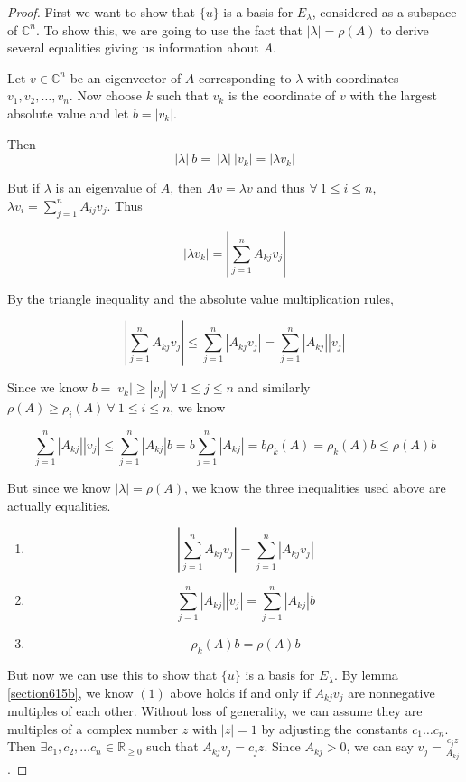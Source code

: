 \documentclass{amsart}
\theoremstyle{definition}
\theoremstyle{remark}
\numberwithin{equation}{section}
\begin{document}
\begin{proof}

First we want to show that $\{ u \}$ is a basis for $E_{\lambda}$,
considered as a subspace of $\mathbb{C}^n$. To show this, we are
going to use the fact that $|\lambda| = \rho(A)$ to derive several
equalities giving us information about $A$.

Let $v \in \mathbb{C}^n$ be an eigenvector of $A$ corresponding to
$\lambda$ with coordinates $v_1, v_2, \ldots, v_n$. Now choose $k$
such that $v_k$ is the coordinate of $v$ with the largest absolute
value and let $b = |v_k|$.

Then $$ |\lambda|\ b =\ |\lambda|\ |v_k| = |\lambda v_k| $$

But if $\lambda$ is an eigenvalue of $A$, then $Av = \lambda v$ and thus $\forall\ 1 \leq i \leq n$, $\lambda v_i = \sum_{j = 1}^n A_{ij}v_j$.
Thus

$$ |\lambda v_k| = | \sum_{j = 1}^n A_{kj}v_j | $$

By the triangle inequality and the absolute value multiplication
rules,

$$ | \sum_{j = 1}^n A_{kj}v_j | \leq \sum_{j=1}^n |A_{kj}v_j| = \sum_{j=1}^n |A_{kj}| |v_j| $$

Since we know $b = |v_k| \geq |v_j| \ \forall\ 1 \leq j \leq n$ and
similarly $\rho(A) \geq  \rho_i(A)\ \forall\ 1 \leq i \leq n $, we
know

$$ \sum_{j=1}^n |A_{kj}| |v_j|  \leq \sum_{j=1}^n |A_{kj}| b = b \sum_{j=1}^n |A_{kj}| =  b\rho_k(A) = \rho_k(A)b \leq \rho(A)b $$


But since we know $|\lambda| = \rho(A)$, we know the three inequalities used above are actually equalities.

\begin{enumerate}

    \item $$| \sum_{j = 1}^n A_{kj}v_j | = \sum_{j=1}^n |A_{kj}v_j|$$

    \item $$\sum_{j=1}^n |A_{kj}| |v_j|  = \sum_{j=1}^n |A_{kj}| b$$

    \item $$\rho_k(A)b = \rho(A)b$$ \newline

\end{enumerate}


But now we can use this to show that $\{ u \}$ is a basis for
$E_{\lambda}$. By lemma \ref{section615b}, we know $(1)$ above holds
if and only if $A_{kj}v_j$ are nonnegative multiples of each other.
Without loss of generality, we can assume they are multiples of a
complex number $z$ with $|z| = 1$ by adjusting the constants $c_1
\ldots c_n$. Then $\exists c_1, c_2, \ldots c_n \in \mathbb{R}_{\geq
0}$ such that $A_{kj}v_j = c_j z$. Since $A_{kj} > 0$, we can say
$v_j = \frac{c_jz}{A_{kj}}$.


\end{proof}
\end{document}
